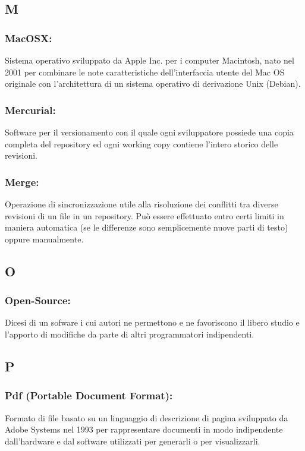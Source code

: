 \subsection*{\huge{M}}
\subsubsection*{MacOSX:} Sistema operativo sviluppato da Apple Inc. per i
computer Macintosh, nato nel 2001 per combinare le note caratteristiche
dell'interfaccia utente del Mac OS originale con l'architettura di un sistema
operativo di derivazione Unix (Debian).

\subsubsection*{Mercurial:} Software per il versionamento con il quale ogni
sviluppatore possiede una copia completa del repository ed ogni working copy
contiene l'intero storico delle revisioni.

\subsubsection*{Merge:} Operazione di sincronizzazione utile alla
risoluzione dei conflitti tra diverse revisioni di un file in un repository.
Pu\`o essere effettuato entro certi limiti in maniera automatica (se le
differenze sono semplicemente nuove parti di testo) oppure manualmente.


\subsection*{\huge{O}}

\subsubsection*{Open-Source:} Dicesi di un sofware i cui autori ne permettono e
ne favoriscono il libero studio e l'apporto di modifiche da parte di altri programmatori indipendenti.
\subsection*{\huge{P}}

\subsubsection*{Pdf (Portable Document Format):} Formato di file basato su un
linguaggio di descrizione di pagina sviluppato da Adobe Systems nel 1993 per rappresentare
documenti in modo indipendente dall'hardware e dal software utilizzati per generarli o per visualizzarli.

